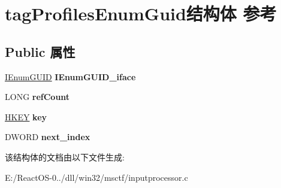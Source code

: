 \hypertarget{structtag_profiles_enum_guid}{}\section{tag\+Profiles\+Enum\+Guid结构体 参考}
\label{structtag_profiles_enum_guid}
\subsection*{Public 属性}
\begin{DoxyCompactItemize}
\item 
\mbox{\label{structtag_profiles_enum_guid_a0a91eeb81ed3bc158ac8897ee60e3bbf}} 
\hyperlink{interface_i_enum_g_u_i_d}{I\+Enum\+G\+U\+ID} {\bfseries I\+Enum\+G\+U\+I\+D\+\_\+iface}
\item 
\mbox{\label{structtag_profiles_enum_guid_a03b1c898893802374999501a2460e88d}} 
L\+O\+NG {\bfseries ref\+Count}
\item 
\mbox{\label{structtag_profiles_enum_guid_a41f3f05597db01befb2ecc026ea4be4c}} 
\hyperlink{interfacevoid}{H\+K\+EY} {\bfseries key}
\item 
\mbox{\label{structtag_profiles_enum_guid_a35b513440c562cbfc2628d4303badfc6}} 
D\+W\+O\+RD {\bfseries next\+\_\+index}
\end{DoxyCompactItemize}


该结构体的文档由以下文件生成\+:\begin{DoxyCompactItemize}
\item 
E\+:/\+React\+O\+S-\/0../dll/win32/msctf/inputprocessor.\+c\end{DoxyCompactItemize}
